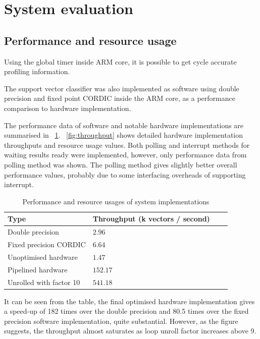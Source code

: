 \documentclass[journal]{IEEEtran}
\newcommand{\fref}[1]{\figurename~\ref{#1}}
\newcommand{\tref}[1]{\tablename~\ref{#1}}
\begin{document}
\section{System evaluation}

\subsection{Performance and resource usage}

Using the global timer inside ARM core, it is possible to get cycle accurate profiling information.

The support vector classifier was also implemented as software using double precision and fixed point CORDIC inside the ARM core, as a performance comparison to hardware implementation.

The performance data of software and notable hardware implementations are summarised in \tref{tbl:throughput}. \fref{fig:throughput} shows detailed hardware implementation throughputs and resource usage values. Both polling and interrupt methods for waiting results ready were implemented, however, only performance data from polling method was shown. The polling method gives slightly better overall performance values, probably due to some interfacing overheads of supporting interrupt.

\begin{table}[ht]
	\renewcommand{\arraystretch}{1.3}
	\caption{Performance and resource usages of system implementations}
	\label{tbl:throughput}
	\centering
	\begin{tabular}{llll}
		\hline
		Type			& Throughput (k vectors / second)	\\
		\hline
		Double precision	& $2.96$	\\
		Fixed precision CORDIC	& $6.64$	\\
		\hline
		Unoptimised hardware	& $1.47$	\\
		Pipelined hardware	& $152.17$	\\
		Unrolled with factor 10	& $541.18$	\\
		\hline
	\end{tabular}
\end{table}

It can be seen from the table, the final optimised hardware implementation gives a speed-up of 182 times over the double precision and 80.5 times over the fixed precision software implementation, quite substantial. However, as the figure suggests, the throughput almost saturates as loop unroll factor increases above 9.
\end{document}
